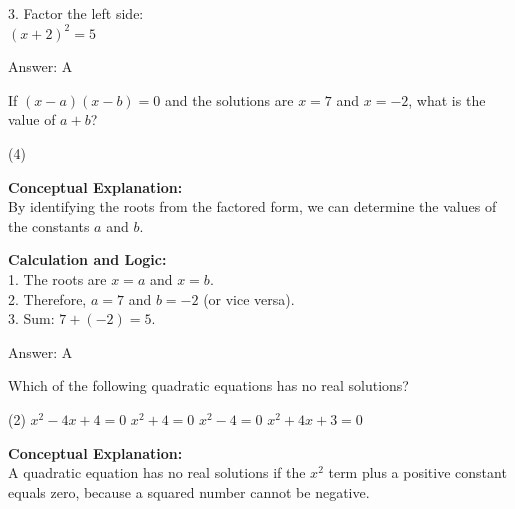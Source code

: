 \documentclass[11pt,paper=a4,answers]{exam}
\begin{document}
\begin{questions}
\begin{solution}
3. Factor the left side: \\
   $(x + 2)^2 = 5$

\vspace{20pt}

Answer: \colorbox{yellow!100}{A}
\end{solution}

\vspace{30pt}

\question
If $(x - a)(x - b) = 0$ and the solutions are $x = 7$ and $x = -2$, what is the value of $a + b$?
\begin{tasks}(4)
\end{tasks}

\begin{solution}
\textbf{Conceptual Explanation:} \\
By identifying the roots from the factored form, we can determine the values of the constants $a$ and $b$.

\vspace{15pt}

\textbf{Calculation and Logic:} \\
1. The roots are $x = a$ and $x = b$. \\
2. Therefore, $a = 7$ and $b = -2$ (or vice versa). \\
3. Sum: $7 + (-2) = 5$.

\vspace{20pt}

Answer: \colorbox{yellow!100}{A}
\end{solution}

\vspace{30pt}

\question
Which of the following quadratic equations has no real solutions?
\begin{tasks}(2)
    \task $x^2 - 4x + 4 = 0$
    \task $x^2 + 4 = 0$
    \task $x^2 - 4 = 0$
    \task $x^2 + 4x + 3 = 0$
\end{tasks}

\begin{solution}
\textbf{Conceptual Explanation:} \\
A quadratic equation has no real solutions if the $x^2$ term plus a positive constant equals zero, because a squared number cannot be negative.

\vspace{15pt}


\end{solution}
\end{questions}
\end{document}

